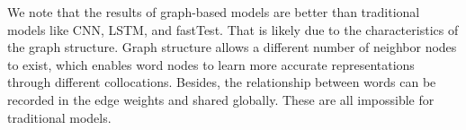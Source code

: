 \documentclass[11pt,a4paper]{article}
\begin{document}
\begin{table}[tb]
    \centering
    \footnotesize
    \caption{\label{acc-table} Accuracy on several text classification datasets. Model with "*" means that all word vectors are initialized by Glove word embeddings. We run all models 10 times and report mean results. }
\end{table}

We note that the results of graph-based models are better than traditional models like CNN, LSTM, and fastTest. That is likely due to the characteristics of the graph structure. Graph structure allows a different number of neighbor nodes to exist, which enables word nodes to learn more accurate representations through different collocations. Besides, the relationship between words can be recorded in the edge weights and shared globally. These are all impossible for traditional models. 
\end{document}
